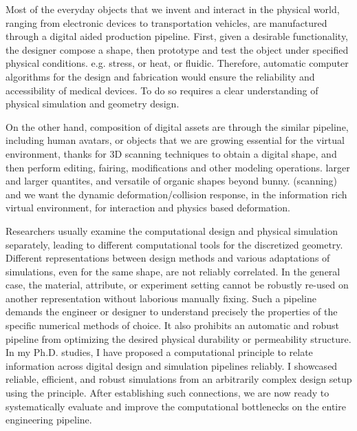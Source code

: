 % 

Most of the everyday objects that we invent and interact in the physical world, ranging from electronic devices to transportation vehicles, are manufactured through a digital aided production pipeline.
First, given a desirable functionality, the designer compose a shape, then prototype and test the object under specified physical conditions. e.g. stress, or heat, or fluidic. 
Therefore, automatic computer algorithms for the design and fabrication would ensure the reliability and accessibility of medical devices. To do so requires a clear understanding of physical simulation and geometry design.

On the other hand, composition of digital assets are through the similar pipeline, including human avatars, or objects that we are growing essential for the  virtual environment, thanks for 3D scanning techniques to obtain a digital shape, and then perform editing, fairing, modifications and other modeling operations. larger and larger quantites, and versatile of organic shapes beyond bunny. (scanning) and we want the dynamic deformation/collision response, in the information rich virtual environment, for interaction and physics based deformation.

Researchers usually examine the computational design and physical simulation separately, leading to different computational tools for the discretized geometry. Different representations between design methods and various adaptations of simulations, even for the same shape, are not reliably correlated. In the general case, the material, attribute, or experiment setting cannot be robustly re-used on another representation without laborious manually fixing. Such a pipeline demands the engineer or designer to understand precisely the properties of the specific numerical methods of choice. It also prohibits an automatic and robust pipeline from optimizing the desired physical durability or permeability structure. In my Ph.D. studies, I have proposed a computational principle to relate information across digital design and simulation pipelines reliably. I showcased reliable, efficient, and robust simulations from an arbitrarily complex design setup using the principle. After establishing such connections, we are now ready to systematically evaluate and improve the computational bottlenecks on the entire engineering pipeline.

